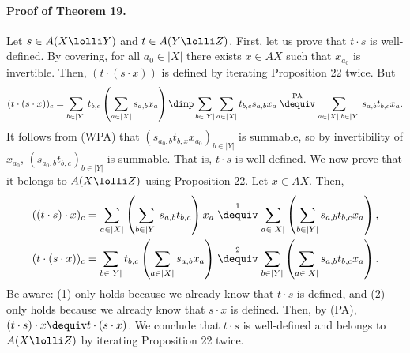 \paragraph{Proof of Theorem 19.} Let $s\in A(X\lolli Y)$ and $t\in A(Y\lolli Z)$. First, let us prove that $t\cdot s$ is well-defined. By covering, for all $a_0\in|X|$ there exists $x\in AX$ such that $x_{a_0}$ is invertible. Then, $(t\cdot(s\cdot x))$ is defined by iterating Proposition 22 twice. But
\[(t\cdot(s\cdot x))_c=\sum_{b\in|Y|}t_{b,c}\left(\sum_{a\in|X|}s_{a,b}x_a\right)\dimp\sum_{b\in|Y|}\sum_{a\in|X|}t_{b,c}s_{a,b}x_a\mathrel{\stackrel{\mathrm{PA}}{\dequiv}}\sum_{a\in|X|,b\in|Y|}s_{a,b}t_{b,c}x_a.\]
It follows from (WPA) that $(s_{a_0,b}t_{b,x}x_{a_0})_{b\in|Y|}$ is summable, so by invertibility of $x_{a_0}$, $(s_{a_0,b}t_{b,c})_{b\in|Y|}$ is summable. That is, $t\cdot s$ is well-defined. We now prove that it belongs to $A(X\lolli Z)$ using Proposition 22. Let $x\in AX$. Then,
\begin{align*}((t\cdot s)\cdot x)_c&=\sum_{a\in|X|}\left(\sum_{b\in|Y|}s_{a,b}t_{b,c}\right)x_a\mathrel{\stackrel{1}{\dequiv}}\sum_{a\in|X|}\left(\sum_{b\in|Y|}s_{a,b}t_{b,c}x_a\right),\\(t\cdot(s\cdot x))_c&=\sum_{b\in|Y|}t_{b,c}\left(\sum_{a\in|X|}s_{a,b}x_a\right)\mathrel{\stackrel{2}{\dequiv}}\sum_{b\in|Y|}\left(\sum_{a\in|X|}s_{a,b}t_{b,c}x_a\right).\end{align*}
Be aware: (1) only holds because we already know that $t\cdot s$ is defined, and (2) only holds because we already know that $s\cdot x$ is defined. Then, by (PA), $(t\cdot s)\cdot x\dequiv t\cdot(s\cdot x)$. We conclude that $t\cdot s$ is well-defined and belongs to $A(X\lolli Z)$ by iterating Proposition 22 twice.
